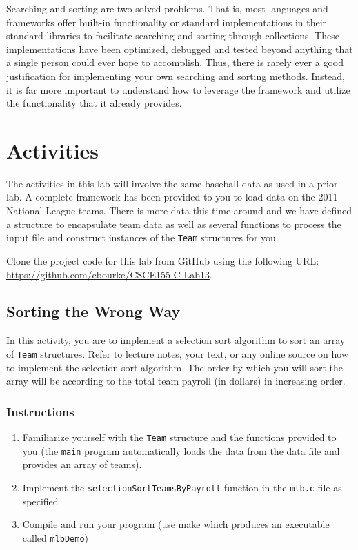 \documentclass[12pt]{scrartcl}
\begin{document}
Searching and sorting are two solved problems.  That is, most 
languages and frameworks offer built-in functionality or 
standard implementations in their standard libraries to facilitate 
searching and sorting through collections.  These implementations 
have been optimized, debugged and tested beyond anything that 
a single person could ever hope to accomplish.  Thus, there is 
rarely ever a good justification for implementing your own 
searching and sorting methods.  Instead, it is far more important 
to understand how to leverage the framework and utilize the 
functionality that it already provides.  

\section{Activities}

The activities in this lab will involve the same baseball data as 
used in a prior lab.  A complete framework has been provided 
to you to load data on the 2011 National League teams.  There 
is more data this time around and we have defined a structure 
to encapsulate team data as well as several functions to process 
the input file and construct instances of the \texttt{Team} 
structures for you.

Clone the project code for this lab from GitHub using the following 
URL: \url{https://github.com/cbourke/CSCE155-C-Lab13}.

\subsection{Sorting the Wrong Way}

In this activity, you are to implement a selection sort algorithm to 
sort an array of \texttt{Team} structures.  Refer to lecture notes, 
your text, or any online source on how to implement the selection sort 
algorithm.  The order by which you will sort the array will be according 
to the total team payroll (in dollars) in increasing order.

\subsubsection*{Instructions}

\begin{enumerate}
  \item Familiarize yourself with the \texttt{Team} structure and 
	the functions provided to you (the \texttt{main} program 
	automatically loads the data from the data file and provides an 
	array of teams).  
  \item Implement the \texttt{selectionSortTeamsByPayroll} 
	function in the \texttt{mlb.c} file as specified
  \item Compile and run your program (use make which produces an 
	executable called \texttt{mlbDemo})
\end{enumerate}
\end{document}
